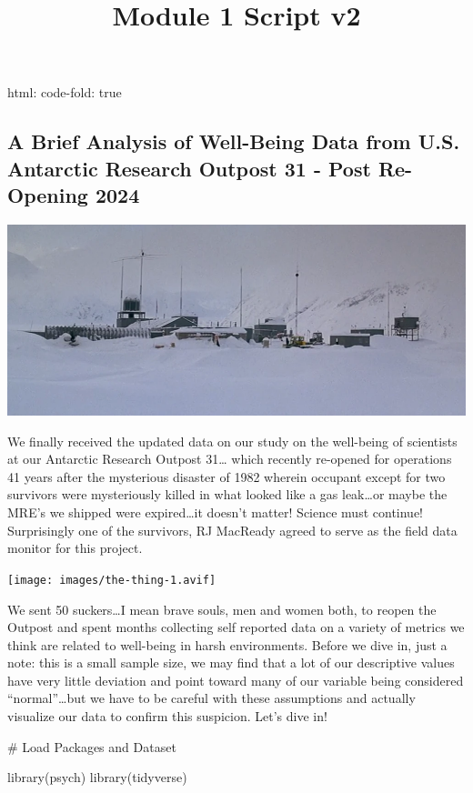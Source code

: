 \documentclass[
  letterpaper,
  DIV=11,
  numbers=noendperiod]{scrartcl}
\title{Module 1 Script v2}
\author{}
\date{}
\newenvironment{Shaded}{\begin{snugshade}}{\end{snugshade}}
\newcommand{\CommentTok}[1]{\textcolor[rgb]{0.37,0.37,0.37}{#1}}
\newcommand{\FunctionTok}[1]{\textcolor[rgb]{0.28,0.35,0.67}{#1}}
\newcommand{\NormalTok}[1]{\textcolor[rgb]{0.00,0.23,0.31}{#1}}
\begin{document}
\maketitle

html: code-fold: true

\subsection{A Brief Analysis of Well-Being Data from U.S. Antarctic
Research Outpost 31 - Post Re-Opening
2024}\label{a-brief-analysis-of-well-being-data-from-u.s.-antarctic-research-outpost-31---post-re-opening-2024}

\includegraphics{images/U.S._Outpost_31_-_Profile.png}

We finally received the updated data on our study on the well-being of
scientists at our Antarctic Research Outpost 31\ldots{} which recently
re-opened for operations 41 years after the mysterious disaster of 1982
wherein occupant except for two survivors were mysteriously killed in
what looked like a gas leak\ldots or maybe the MRE's we shipped were
expired\ldots it doesn't matter! Science must continue! Surprisingly one
of the survivors, RJ MacReady agreed to serve as the field data monitor
for this project.

\texttt{[image: images/the-thing-1.avif]}

We sent 50 suckers\ldots I mean brave souls, men and women both, to
reopen the Outpost and spent months collecting self reported data on a
variety of metrics we think are related to well-being in harsh
environments. Before we dive in, just a note: this is a small sample
size, we may find that a lot of our descriptive values have very little
deviation and point toward many of our variable being considered
``normal''\ldots but we have to be careful with these assumptions and
actually visualize our data to confirm this suspicion. Let's dive in!

\begin{Shaded}
\begin{Highlighting}[]
\CommentTok{\# Load Packages and Dataset}

\FunctionTok{library}\NormalTok{(psych)}
\FunctionTok{library}\NormalTok{(tidyverse)}
\end{Highlighting}
\end{Shaded}
\end{document}
